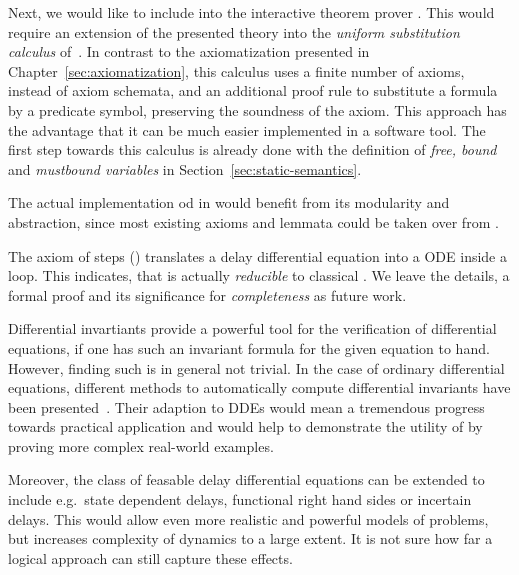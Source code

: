         Next, we would like to include \ddL into the interactive theorem prover \KeYmaeraX.
        This would require an extension of the presented theory into the \emph{uniform substitution calculus} of~\cite{Platzer15Uniform}.
        In contrast to the axiomatization presented in Chapter~\ref{sec:axiomatization}, this calculus uses a finite number of axioms, instead of axiom schemata, and an additional proof rule to substitute a formula by a predicate symbol, preserving the soundness of the axiom. This approach has the advantage that it can be much easier implemented in a software tool.
        The first step towards this calculus is already done with the definition of \emph{free, bound} and \emph{mustbound variables} in Section~\ref{sec:static-semantics}.

        The actual implementation od \ddL in \KeYmaeraX would benefit from its modularity and abstraction, since most existing axioms and lemmata could be taken over from \dL.

        The axiom of steps () translates a delay differential equation into a ODE inside a loop. This indicates, that \ddL is actually \emph{reducible} to classical \dL. We leave the details, a formal proof and its significance for \emph{completeness} as future work.

        Differential invartiants provide a powerful tool for the verification of differential equations, if one has such an invariant formula for the given equation to hand.
        However, finding such is in general not trivial. In the case of ordinary differential equations, different methods to automatically compute differential invariants have been presented~\cite{Platzer12LogicsDynSys}.
        Their adaption to DDEs would mean a tremendous progress towards practical application and would help to demonstrate the utility of \ddL by proving more complex real-world examples.
                
        Moreover, the class of feasable delay differential equations can be extended to include e.g.\ state dependent delays, functional right hand sides or incertain delays.
        This would allow even more realistic and powerful models of problems, but increases complexity of dynamics to a large extent.
        It is not sure how far a logical approach can still capture these effects.

        

